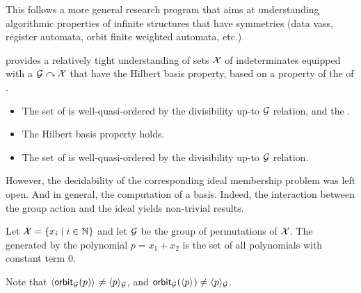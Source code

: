 This follows a more general research program that aims at understanding 
algorithmic properties of infinite structures that have symmetries
(data vass, register automata, orbit finite weighted automata, etc.)

\cite{GHOLAS24} provides a relatively tight understanding of sets $\X$ of
indeterminates equipped with a  $\group \curvearrowright \X$
that have the Hilbert basis property, based on a property of the
 of .

\begin{itemize}
    \item The set of  is well-quasi-ordered
        by the divisibility up-to $\group$ relation,
        and the  .
    \item The Hilbert basis property holds.
    \item The set of  is well-quasi-ordered
        by the divisibility up-to $\group$ relation.
\end{itemize}


However, the decidability of the corresponding ideal membership problem was
left open. And in general, the computation of a basis. Indeed, the interaction
between the group action and the ideal yields non-trivial results.

\begin{example}
    Let $\X = \setof{ x_i }{ i \in \N}$ and
    let $\group$ be the group of permutations of $\X$.
    The 
    generated by the polynomial $p = x_1 + x_2$ is
    the set of all polynomials with constant term $0$.

    Note that 
    $\gen{\orbit[\group]{p}}{} \neq \gen{p}{\group}$,
    and
    $\orbit[\group]{\gen{p}{}} \neq \gen{p}{\group}$.
\end{example}

